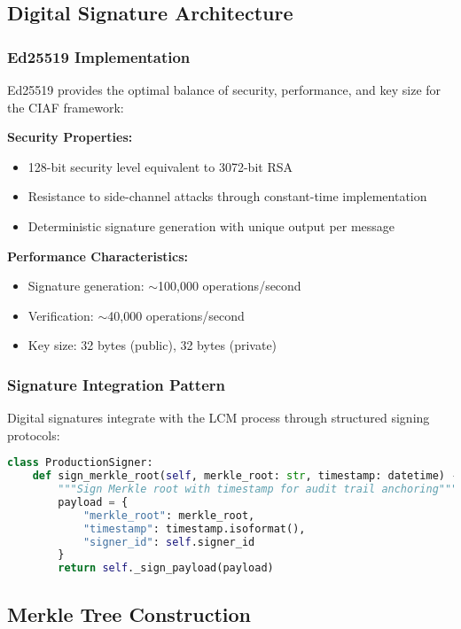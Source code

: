 \documentclass[12pt,a4paper]{article}
\begin{document}
\subsection{Digital Signature Architecture}

\subsubsection{Ed25519 Implementation}

Ed25519 provides the optimal balance of security, performance, and key size for the CIAF framework:

\textbf{Security Properties:}
\begin{itemize}
\item 128-bit security level equivalent to 3072-bit RSA
\item Resistance to side-channel attacks through constant-time implementation
\item Deterministic signature generation with unique output per message
\end{itemize}

\textbf{Performance Characteristics:}
\begin{itemize}
\item Signature generation: $\sim$100,000 operations/second
\item Verification: $\sim$40,000 operations/second
\item Key size: 32 bytes (public), 32 bytes (private)
\end{itemize}

\subsubsection{Signature Integration Pattern}

Digital signatures integrate with the LCM process through structured signing protocols:

\begin{lstlisting}[language=Python, caption=Production Signature Integration]
class ProductionSigner:
    def sign_merkle_root(self, merkle_root: str, timestamp: datetime) -> str:
        """Sign Merkle root with timestamp for audit trail anchoring"""
        payload = {
            "merkle_root": merkle_root,
            "timestamp": timestamp.isoformat(),
            "signer_id": self.signer_id
        }
        return self._sign_payload(payload)
\end{lstlisting}

\subsection{Merkle Tree Construction}
\end{document}
